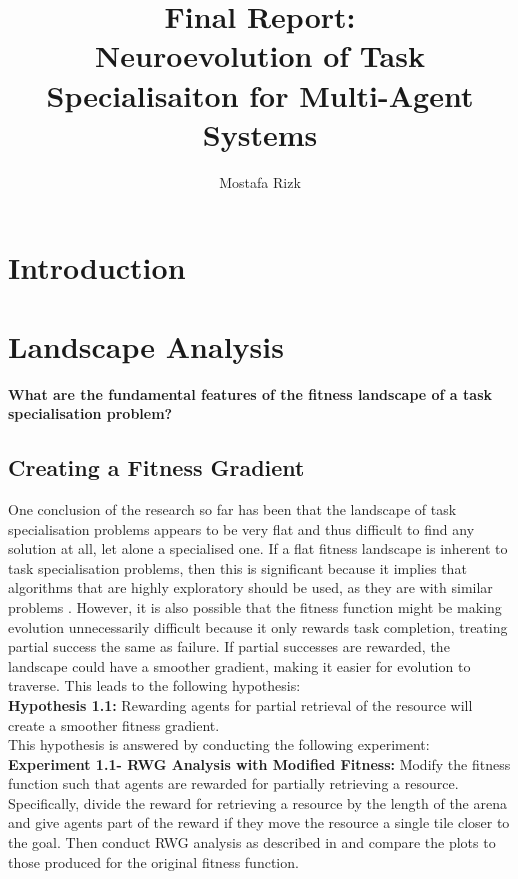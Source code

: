 \documentclass[12pt]{article}
\title{Final Report:\\ Neuroevolution of Task Specialisaiton for Multi-Agent Systems}
\author{Mostafa Rizk}
\begin{document}
\maketitle

\section{Introduction}

\section{Landscape Analysis}

\textbf{What are the fundamental features of the fitness landscape of a task specialisation problem?}\\

\subsection{Creating a Fitness Gradient}

One conclusion of the research so far has been that the landscape of task specialisation problems appears to be very flat and thus difficult to find any solution at all, let alone a specialised one.
If a flat fitness landscape is inherent to task specialisation problems, then this is significant because it implies that algorithms that are highly exploratory should be used, as they are with similar problems \cite{oller:AAMAS:2020}.
However, it is also possible that the fitness function might be making evolution unnecessarily difficult because it only rewards task completion, treating partial success the same as failure.
If partial successes are rewarded, the landscape could have a smoother gradient, making it easier for evolution to traverse.
This leads to the following hypothesis:\\

\textbf{Hypothesis 1.1:} Rewarding agents for partial retrieval of the resource will create a smoother fitness gradient.\\

This hypothesis is answered by conducting the following experiment:\\

\textbf{Experiment 1.1- RWG Analysis with Modified Fitness:}  Modify the fitness function such that agents are rewarded for partially retrieving a resource.
Specifically, divide the reward for retrieving a resource by the length of the arena and give agents part of the reward if they move the resource a single tile closer to the goal.
Then conduct RWG analysis as described in \cite{oller:AAMAS:2020} and compare the plots to those produced for the original fitness function.\\
\end{document}
